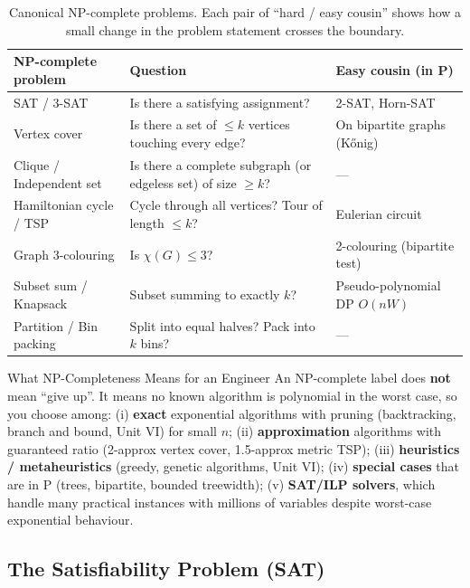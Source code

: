 \documentclass[11pt,a4paper]{article}
\begin{document}
\begin{table}[h!]
\centering
\small
{}
\begin{tabularx}{\textwidth}{|l|X|X|}
\hline
\rowcolor{NavyPrimary}\color{white}\textbf{NP-complete problem} & \color{white}\textbf{Question} & \color{white}\textbf{Easy cousin (in P)} \\ \hline
SAT / 3-SAT & Is there a satisfying assignment? & 2-SAT, Horn-SAT \\ \hline
Vertex cover & Is there a set of $\le k$ vertices touching every edge? & On bipartite graphs (K\H{o}nig) \\ \hline
Clique / Independent set & Is there a complete subgraph (or edgeless set) of size $\ge k$? & --- \\ \hline
Hamiltonian cycle / TSP & Cycle through all vertices? Tour of length $\le k$? & Eulerian circuit \\ \hline
Graph 3-colouring & Is $\chi(G) \le 3$? & 2-colouring (bipartite test) \\ \hline
Subset sum / Knapsack & Subset summing to exactly $k$? & Pseudo-polynomial DP $O(nW)$ \\ \hline
Partition / Bin packing & Split into equal halves? Pack into $k$ bins? & --- \\ \hline
\end{tabularx}
\caption{Canonical NP-complete problems. Each pair of ``hard / easy cousin'' shows how a small change in the problem statement crosses the boundary.}
\end{table}

\begin{examtip}{What NP-Completeness Means for an Engineer}
An NP-complete label does \textbf{not} mean ``give up''. It means no known algorithm is polynomial in the worst case, so you choose among: (i) \textbf{exact} exponential algorithms with pruning (backtracking, branch and bound, Unit VI) for small $n$; (ii) \textbf{approximation} algorithms with guaranteed ratio (2-approx vertex cover, 1.5-approx metric TSP); (iii) \textbf{heuristics / metaheuristics} (greedy, genetic algorithms, Unit VI); (iv) \textbf{special cases} that are in P (trees, bipartite, bounded treewidth); (v) \textbf{SAT/ILP solvers}, which handle many practical instances with millions of variables despite worst-case exponential behaviour.
\end{examtip}

\subsection{The Satisfiability Problem (SAT)}
\end{document}
